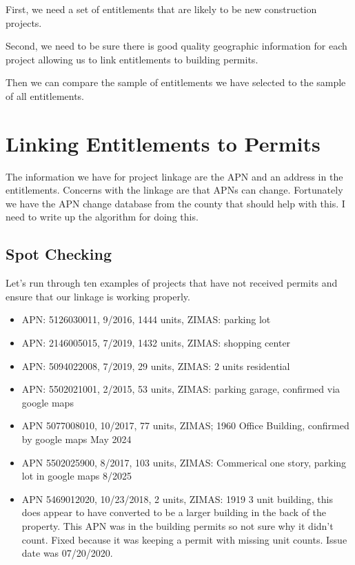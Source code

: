 \documentclass[12pt]{article}
\theoremstyle{definition}
\begin{document}
First, we need a set of entitlements that are likely to be new construction projects. 

Second, we need to be sure there is good quality geographic information for each project allowing us to link entitlements to building permits. 

Then we can compare the sample of entitlements we have selected to the sample of all entitlements. 


\section{Linking Entitlements to Permits}
The information we have for project linkage are the APN and an address in the entitlements. Concerns with the linkage are that APNs can change. Fortunately we have the APN change database from the county that should help with this. I need to write up the algorithm for doing this. 

\subsection{Spot Checking}
Let's run through ten examples of projects that have not received permits and ensure that our linkage is working properly. 

\begin{itemize}
    \item APN: 5126030011, 9/2016, 1444 units, ZIMAS: parking lot
    \item APN: 2146005015, 7/2019, 1432 units, ZIMAS: shopping center
    \item APN: 5094022008, 7/2019, 29 units, ZIMAS: 2 units residential
    \item APN: 5502021001, 2/2015, 53 units, ZIMAS: parking garage, confirmed via google maps
    \item APN 5077008010, 10/2017, 77 units, ZIMAS; 1960 Office Building, confirmed by google maps May 2024 
    \item APN 5502025900, 8/2017, 103 units, ZIMAS: Commerical one story, parking lot in google maps 8/2025
    \item APN 5469012020, 10/23/2018, 2 units, ZIMAS: 1919 3 unit building, this does appear to have converted to be a larger building in the back of the property. This APN was in the building permits so not sure why it didn't count. Fixed because it was keeping a permit with missing unit counts. Issue date was 07/20/2020. 
\end{itemize}
\end{document}
